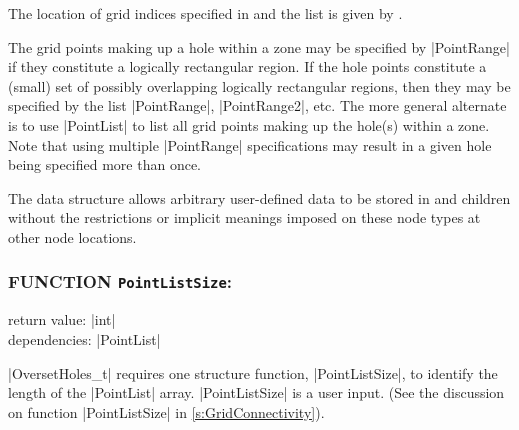 The location of grid indices specified in  and the
 list is given by .

The grid points making up a hole within a zone may be specified by
|PointRange| if they constitute a logically rectangular region.  If the hole
points constitute a (small) set of possibly overlapping logically rectangular
regions, then they may be specified by the list |PointRange|, |PointRange2|,
etc.  The more general alternate is to use |PointList| to list all grid
points making up the hole(s) within a zone.
Note that using multiple |PointRange| specifications may result in a
given hole being specified more than once.

The  data structure allows arbitrary
user-defined data to be stored in  and
 children without the restrictions or implicit
meanings imposed on these node types at other node locations.

\subsubsection*{FUNCTION \texttt{PointListSize}:}

\noindent return value: |int| \\
\noindent dependencies: |PointList|

|OversetHoles_t| requires one structure function, |PointListSize|, to 
identify the length of the |PointList| array.
|PointListSize| is a user input.
(See the discussion on function |PointListSize| in
\autoref{s:GridConnectivity}).

